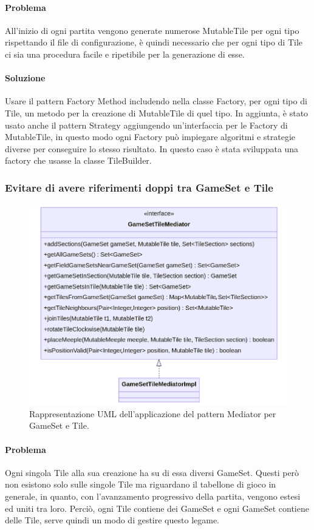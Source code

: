 \paragraph{Problema}
All'inizio di ogni partita vengono generate numerose MutableTile per ogni tipo rispettando il file di configurazione, è quindi necessario che per ogni tipo di Tile ci sia una procedura facile e ripetibile per la generazione di esse.
\paragraph{Soluzione}
Usare il pattern Factory Method includendo nella classe Factory, per ogni tipo di Tile, un metodo per la creazione di MutableTile di quel tipo. In aggiunta, è stato usato anche il pattern Strategy aggiungendo un'interfaccia per le Factory di MutableTile, in questo modo ogni Factory può impiegare algoritmi e strategie diverse per conseguire lo stesso risultato. In questo caso è stata sviluppata una factory che usasse la classe TileBuilder.
\clearpage

\subsubsection*{Evitare di avere riferimenti doppi tra GameSet e Tile}
\begin{figure}[ht]
    \centering\includegraphics[scale=.35]{images/gamesettilemediator.png}
    \caption{Rappresentazione UML dell'applicazione del pattern Mediator per GameSet e Tile.}
\end{figure}
\paragraph{Problema}
Ogni singola Tile alla sua creazione ha su di essa diversi GameSet. Questi però non esistono solo sulle singole Tile ma riguardano il tabellone di gioco in generale, in quanto, con l'avanzamento progressivo della partita, vengono estesi ed uniti tra loro. Perciò, ogni Tile contiene dei GameSet e ogni GameSet contiene delle Tile, serve quindi un modo di gestire questo legame.
